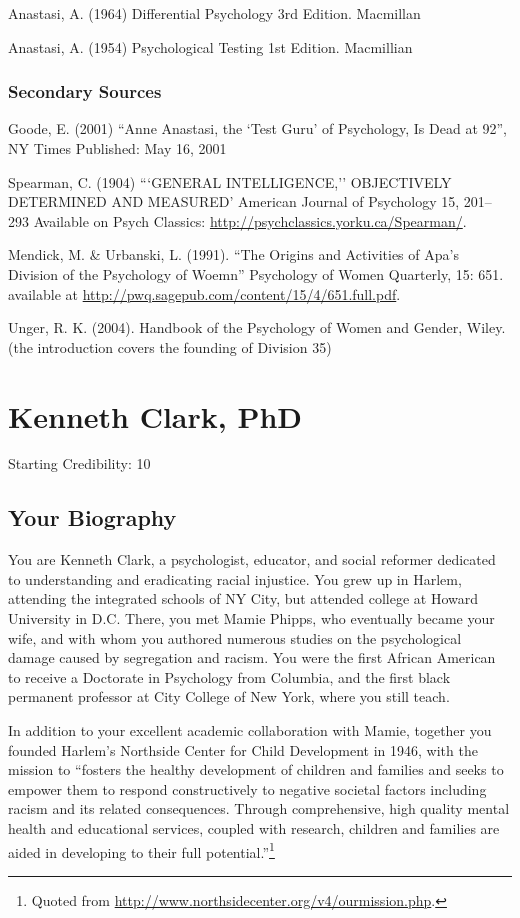 \begin{refsection}
Anastasi, A. (1964) Differential Psychology 3rd Edition. Macmillan

Anastasi, A. (1954) Psychological Testing 1st Edition. Macmillian

\subsection{Secondary Sources}
\label{secondarysources}

Goode, E. (2001) “Anne Anastasi, the `Test Guru' of Psychology, Is Dead at 92”, NY Times Published: May 16, 2001

Spearman, C. (1904) ```GENERAL INTELLIGENCE,'' OBJECTIVELY DETERMINED AND MEASURED' American Journal of Psychology 15, 201--293 Available on Psych Classics: \url{http://psychclassics.yorku.ca/Spearman/}.

Mendick, M. \& Urbanski, L. (1991). “The Origins and Activities of Apa's Division of the Psychology of Woemn” Psychology of Women Quarterly, 15: 651. available at \url{http://pwq.sagepub.com/content/15/4/651.full.pdf}.

Unger, R. K. (2004). Handbook of the Psychology of Women and Gender, Wiley. (the introduction covers the founding of Division 35)

\chapter{Kenneth Clark, PhD}
\label{kennethclarkphd}

Starting Credibility: 10

\section{Your Biography}
\label{yourbiography}

You are Kenneth Clark, a psychologist, educator, and social reformer dedicated to understanding and eradicating racial injustice. You grew up in Harlem, attending the integrated schools of NY City, but attended college at Howard University in D.C. There, you met Mamie Phipps, who eventually became your wife, and with whom you authored numerous studies on the psychological damage caused by segregation and racism. You were the first African American to receive a Doctorate in Psychology from Columbia, and the first black permanent professor at City College of New York, where you still teach.

In addition to your excellent academic collaboration with Mamie, together you founded Harlem's Northside Center for Child Development in 1946, with the mission to “fosters the healthy development of children and families and seeks to empower them to respond constructively to negative societal factors including racism and its related consequences. Through comprehensive, high quality mental health and educational services, coupled with research, children and families are aided in developing to their full potential.”\footnote{Quoted from \url{http://www.northsidecenter.org/v4/ourmission.php}.}


\end{refsection}
